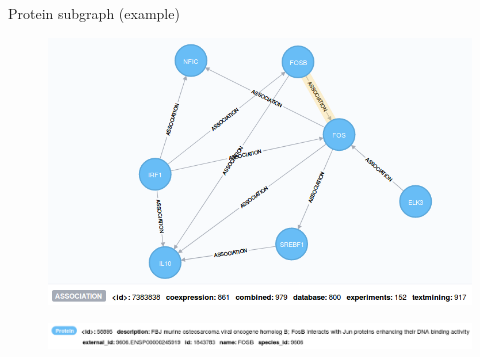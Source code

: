 \documentclass{beamer}
\begin{document}

\begin{frame}{Protein subgraph (example)}
\begin{figure}
    \centering
    \includegraphics[width=0.8\linewidth]{protein_graph.png}
\end{figure}
\begin{figure}
    \centering
    \includegraphics[width=0.9\linewidth]{protein_attributes.png}
\end{figure}
\end{frame}
\end{document}
